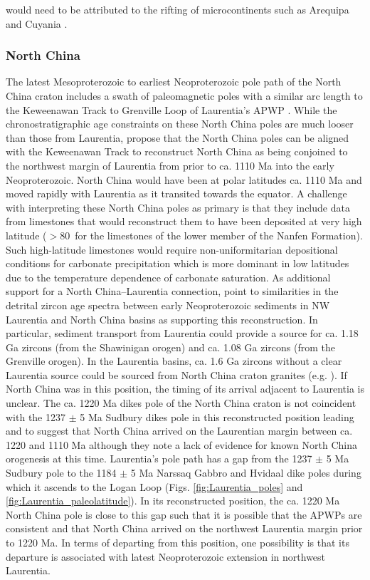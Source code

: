 \documentclass[twocolumn, switch]{article} %
\begin{document}
would need to be attributed to the rifting of microcontinents such as Arequipa and Cuyania \citep{Escayola2011a, Martin2019a}.

\subsubsection{North China}

The latest Mesoproterozoic to earliest Neoproterozoic pole path of the North China craton includes a swath of paleomagnetic poles with a similar arc length to the Keweenawan Track to Grenville Loop of Laurentia's APWP \citep{Zhao2019a, Zhang2021a}. While the chronostratigraphic age constraints on these North China poles are much looser than those from Laurentia, \cite{Zhao2019a} propose that the North China poles can be aligned with the Keweenawan Track to reconstruct North China as being conjoined to the northwest margin of Laurentia from prior to ca. 1110 Ma into the early Neoproterozoic. North China would have been at polar latitudes ca. 1110 Ma and moved rapidly with Laurentia as it transited towards the equator. A challenge with interpreting these North China poles as primary is that they include data from limestones that would reconstruct them to have been deposited at very high latitude ($>$80\textdegree\ for the limestones of the lower member of the Nanfen Formation). Such high-latitude limestones would require non-uniformitarian depositional conditions for carbonate precipitation which is more dominant in low latitudes due to the temperature dependence of carbonate saturation. As additional support for a North China--Laurentia connection, \cite{Zhao2019a} point to similarities in the detrital zircon age spectra between early Neoproterozoic sediments in NW Laurentia and North China basins as supporting this reconstruction. In particular, sediment transport from Laurentia could provide a source for ca. 1.18 Ga zircons (from the Shawinigan orogen) and ca. 1.08 Ga zircons (from the Grenville orogen). In the Laurentia basins, ca. 1.6 Ga zircons without a clear Laurentia source could be sourced from North China craton granites (e.g. \citealp{Wang2020a}). If North China was in this position, the timing of its arrival adjacent to Laurentia is unclear. The ca. 1220 Ma dikes pole of the North China craton is not coincident with the 1237 $\pm$ 5 Ma Sudbury dikes pole in this reconstructed position leading \cite{Zhao2019a} and \cite{Zhang2021a} to suggest that North China arrived on the Laurentian margin between ca. 1220 and 1110 Ma although they note a lack of evidence for known North China orogenesis at this time. Laurentia's pole path has a gap from the 1237 $\pm$ 5 Ma Sudbury pole to the 1184 $\pm$ 5 Ma Narssaq Gabbro and Hvidaal dike poles during which it ascends to the Logan Loop (Figs. \ref{fig:Laurentia_poles} and \ref{fig:Laurentia_paleolatitude}). In its reconstructed position, the ca. 1220 Ma North China pole is close to this gap such that it is possible that the APWPs are consistent and that North China arrived on the northwest Laurentia margin prior to 1220 Ma. In terms of departing from this position, one possibility is that its departure is associated with latest Neoproterozoic extension in northwest Laurentia.
\end{document}
